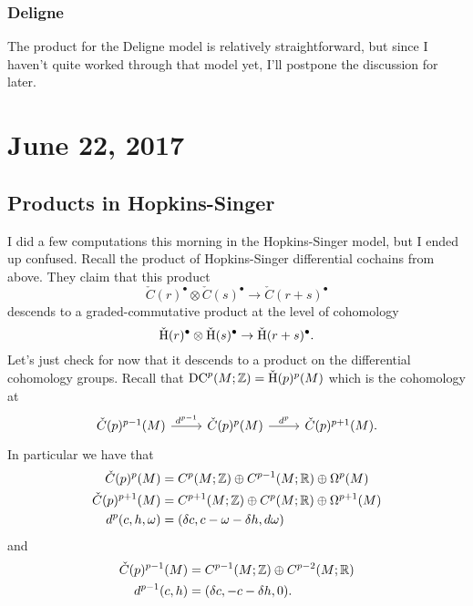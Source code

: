 \documentclass{amsart}
\DeclareMathOperator{\DC}{DC} %
\begin{document}
\subsubsection{Deligne}
The product for the Deligne model is relatively straightforward, but since I haven't quite
worked through that model yet, I'll postpone the discussion for later.

\section{June 22, 2017}

\subsection{Products in Hopkins-Singer}
I did a few computations this morning in the Hopkins-Singer model, but I ended up
confused. Recall the product of Hopkins-Singer differential cochains from above.
They claim that this product
\begin{equation*}
    \check C(r)^\bullet \otimes \check C(s)^\bullet \to \check C(r+s)^\bullet
\end{equation*}
descends to a graded-commutative product at the level of cohomology
\begin{equation*}
    \check {\operatorname{H}}(r)^\bullet \otimes \check {\operatorname{H}}(s)^\bullet \to \check{\operatorname{H}}(r+s)^\bullet.
\end{equation*}
Let's just check for now that it descends to a product on the differential cohomology
groups. Recall that $\DC^p(M;\Z)=\check\HH(p)^p(M)$ which is the cohomology at
\begin{equation*}
    \begin{tikzcd}
        \check C(p)^{p-1}(M) \rar{d^{p-1}} & \check C(p)^p(M) \rar{d^p} & \check C(p)^{p+1}(M).
    \end{tikzcd}
\end{equation*}
In particular we have that
\begin{align*}
    \check C(p)^p(M) &= C^p(M;\mathbb{Z}) \oplus C^{p-1}(M;\mathbb{R}) \oplus \Omega^p(M)\\
    \check C(p)^{p+1}(M) &= C^{p+1}(M;\mathbb{Z})\oplus C^p(M;\mathbb{R})\oplus\Omega^{p+1}(M)\\
    d^p(c,h,\omega) &= (\delta c,c-\omega-\delta h,d\omega)
\end{align*}
and
\begin{align*}
    \check C(p)^{p-1}(M) &= C^{p-1}(M;\mathbb{Z}) \oplus C^{p-2}(M;\mathbb{R})\\
    d^{p-1}(c,h) &= (\delta c,-c-\delta h,0).
\end{align*}
\end{document}
